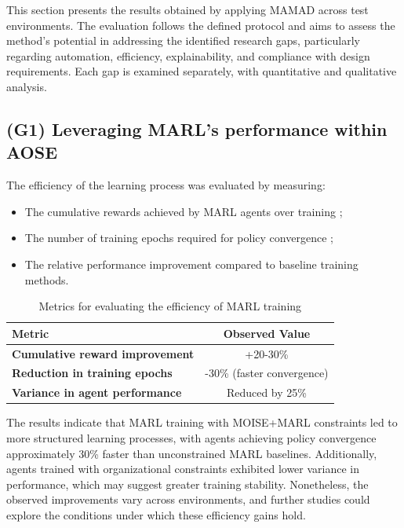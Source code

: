 \documentclass[pdflatex,sn-mathphys-num]{sn-jnl}%
\theoremstyle{thmstyleone}%
\theoremstyle{thmstyletwo}%
\theoremstyle{thmstylethree}%
\begin{document}
This section presents the results obtained by applying MAMAD across test environments. The evaluation follows the defined protocol and aims to assess the method's potential in addressing the identified research gaps, particularly regarding automation, efficiency, explainability, and compliance with design requirements. Each gap is examined separately, with quantitative and qualitative analysis.

\subsection{(G1) Leveraging MARL's performance within AOSE}

The efficiency of the learning process was evaluated by measuring:
\begin{itemize}
    \item The cumulative rewards achieved by MARL agents over training ;
    \item The number of training epochs required for policy convergence ;
    \item The relative performance improvement compared to baseline training methods.
\end{itemize}

\begin{table}[h!]
    \centering
    \caption{Metrics for evaluating the efficiency of MARL training}
    \begin{tabular}{|l|c|}
        \hline
        \textbf{Metric}                        & \textbf{Observed Value}    \\
        \hline
        \textbf{Cumulative reward improvement} & +20-30\%                   \\
        \hline
        \textbf{Reduction in training epochs}  & -30\% (faster convergence) \\
        \hline
        \textbf{Variance in agent performance} & Reduced by 25\%            \\
        \hline
    \end{tabular}
    \label{tab:efficiency}
\end{table}

The results indicate that MARL training with MOISE+MARL constraints led to more structured learning processes, with agents achieving policy convergence approximately 30\% faster than unconstrained MARL baselines. Additionally, agents trained with organizational constraints exhibited lower variance in performance, which may suggest greater training stability. Nonetheless, the observed improvements vary across environments, and further studies could explore the conditions under which these efficiency gains hold.
\end{document}
